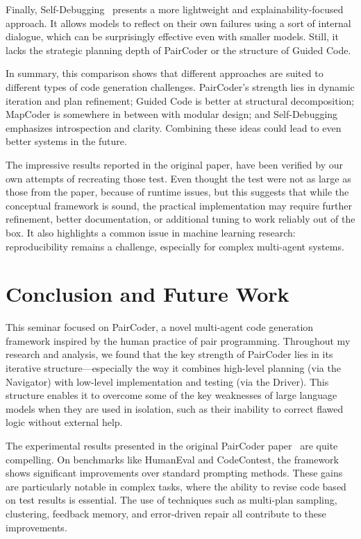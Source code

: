 \documentclass[11pt,a4paper]{article}
\begin{document}
Finally, Self-Debugging~\cite{chen2024selfdebugging} presents a more lightweight and explainability-focused approach. It allows models to reflect on their own failures using a sort of internal dialogue, which can be surprisingly effective even with smaller models. Still, it lacks the strategic planning depth of PairCoder or the structure of Guided Code.

In summary, this comparison shows that different approaches are suited to different types of code generation challenges. PairCoder’s strength lies in dynamic iteration and plan refinement; Guided Code is better at structural decomposition; MapCoder is somewhere in between with modular design; and Self-Debugging emphasizes introspection and clarity. Combining these ideas could lead to even better systems in the future.

The impressive results reported in the original paper, have been verified by our own attempts of recreating those test. Even thought the test were not as large as those from the paper, because of runtime issues, but this suggests that while the conceptual framework is sound, the practical implementation may require further refinement, better documentation, or additional tuning to work reliably out of the box. It also highlights a common issue in machine learning research: reproducibility remains a challenge, especially for complex multi-agent systems.


\section{Conclusion and Future Work}

This seminar focused on PairCoder, a novel multi-agent code generation framework inspired by the human practice of pair programming. Throughout my research and analysis, we found that the key strength of PairCoder lies in its iterative structure—especially the way it combines high-level planning (via the Navigator) with low-level implementation and testing (via the Driver). This structure enables it to overcome some of the key weaknesses of large language models when they are used in isolation, such as their inability to correct flawed logic without external help.

The experimental results presented in the original PairCoder paper~\cite{zhang2024paircoder} are quite compelling. On benchmarks like HumanEval and CodeContest, the framework shows significant improvements over standard prompting methods. These gains are particularly notable in complex tasks, where the ability to revise code based on test results is essential. The use of techniques such as multi-plan sampling, clustering, feedback memory, and error-driven repair all contribute to these improvements.
\end{document}
